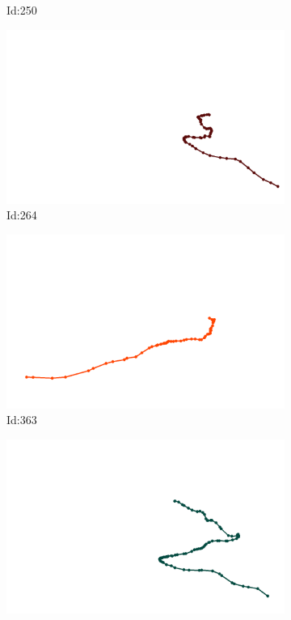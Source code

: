 \documentclass[12pt,twoside]{report}
\begin{document}
\begin{figure}
\begin{subfigure}[b]{0.20\textwidth}
\caption{Id:250}
\end{subfigure}
\begin{subfigure}[b]{0.20\textwidth}
\centering
\includegraphics[width=\textwidth]{../trajectories/264.png}
\caption{Id:264}
\end{subfigure}
\begin{subfigure}[b]{0.20\textwidth}
\centering
\includegraphics[width=\textwidth]{../trajectories/363.png}
\caption{Id:363}
\end{subfigure}
\begin{subfigure}[b]{0.20\textwidth}
\centering
\includegraphics[width=\textwidth]{../trajectories/402.png}

\end{subfigure}
\end{figure}
\end{document}
